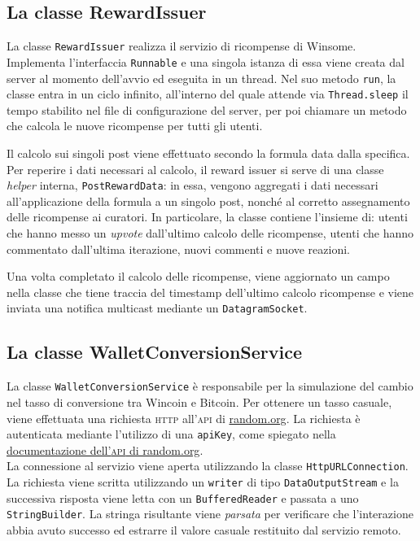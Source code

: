 \documentclass[a4paper,8pt]{article} %
\def\code#1{\texttt{#1}}
\begin{document}
\subsection{La classe RewardIssuer}
La classe \code{RewardIssuer} realizza il servizio di ricompense di Winsome. Implementa l'interfaccia \code{Runnable} e una singola istanza di essa viene creata dal server al momento dell'avvio ed eseguita in un thread.
Nel suo metodo \code{run}, la classe entra in un ciclo infinito, all'interno del quale attende via \code{Thread.sleep} il tempo stabilito nel file di configurazione del server, per poi chiamare un metodo che calcola
le nuove ricompense per tutti gli utenti.
\par Il calcolo sui singoli post viene effettuato secondo la formula data dalla specifica. Per reperire i dati necessari al calcolo, il reward issuer si serve di una classe \emph{helper} interna, \code{PostRewardData}: in essa,
vengono aggregati i dati necessari all'applicazione della formula a un singolo post, nonché al corretto assegnamento delle ricompense ai curatori. In particolare, la classe contiene l'insieme di: utenti che hanno messo un \emph{upvote}
dall'ultimo calcolo delle ricompense, utenti che hanno commentato dall'ultima iterazione, nuovi commenti e nuove reazioni.
\par Una volta completato il calcolo delle ricompense, viene aggiornato un campo nella classe che tiene traccia del timestamp dell'ultimo calcolo ricompense e viene inviata una notifica multicast mediante un \code{DatagramSocket}.

\subsection{La classe WalletConversionService}
La classe \code{WalletConversionService} è responsabile per la simulazione del cambio nel tasso di conversione tra Wincoin e Bitcoin.
Per ottenere un tasso casuale, viene effettuata una richiesta \textsc{http} all'\textsc{api} di \href{https://random.org}{random.org}. La richiesta è autenticata mediante l'utilizzo di una \code{apiKey}, come spiegato nella
\href{https://api.random.org/json-rpc/4/basic}{documentazione dell'\textsc{api} di random.org}. \\La connessione al servizio viene aperta utilizzando la classe \code{HttpURLConnection}. La richiesta viene scritta utilizzando un \code{writer} di tipo \code{DataOutputStream} e la successiva risposta viene letta
con un \code{BufferedReader} e passata a uno \code{StringBuilder}. La stringa risultante viene \emph{parsata} per verificare che l'interazione abbia avuto successo ed estrarre il valore casuale restituito dal servizio remoto.
\end{document}
